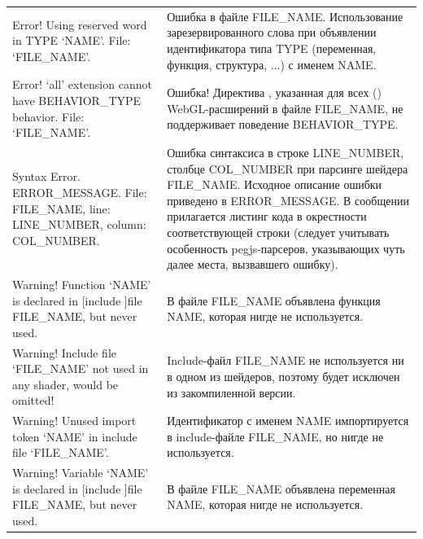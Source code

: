 \documentclass[a4paper,12pt,oneside]{sphinxmanual}
\begin{document}
\begin{tabulary}{\linewidth}{|L|L|}
\hline

Error! Using reserved word in TYPE
`NAME'. File: `FILE\_NAME'.
 & 
Ошибка в файле FILE\_NAME. Использование
зарезервированного слова при объявлении
идентификатора типа TYPE (переменная,
функция, структура, ...) с именем NAME.
\\

Error! `all' extension cannot have
BEHAVIOR\_TYPE behavior. File:
`FILE\_NAME'.
 & 
Ошибка! Директива ,
указанная для всех ()
WebGL-расширений в файле FILE\_NAME, не
поддерживает поведение BEHAVIOR\_TYPE.
\\

Syntax Error. ERROR\_MESSAGE. File:
FILE\_NAME, line: LINE\_NUMBER,
column: COL\_NUMBER.
 & 
Ошибка синтаксиса в строке LINE\_NUMBER,
столбце COL\_NUMBER при парсинге шейдера
FILE\_NAME. Исходное описание ошибки
приведено в ERROR\_MESSAGE. В сообщении
прилагается листинг кода в окрестности
соответствующей строки (следует
учитывать особенность pegjs-парсеров,
указывающих чуть далее места, вызвавшего
ошибку).
\\

Warning! Function `NAME' is
declared in {[}include {]}file
FILE\_NAME, but never used.
 & 
В файле FILE\_NAME объявлена функция NAME,
которая нигде не используется.
\\

Warning! Include file `FILE\_NAME'
not used in any shader, would be
omitted!
 & 
Include-файл FILE\_NAME не используется ни
в одном из шейдеров, поэтому будет
исключен из закомпиленной версии.
\\

Warning! Unused import token `NAME'
in include file `FILE\_NAME'.
 & 
Идентификатор с именем NAME импортируется
в include-файле FILE\_NAME, но нигде не
используется.
\\

Warning! Variable `NAME' is
declared in {[}include {]}file
FILE\_NAME, but never used.
 & 
В файле FILE\_NAME объявлена переменная
NAME, которая нигде не используется.
\\
\hline\end{tabulary}
\end{document}
